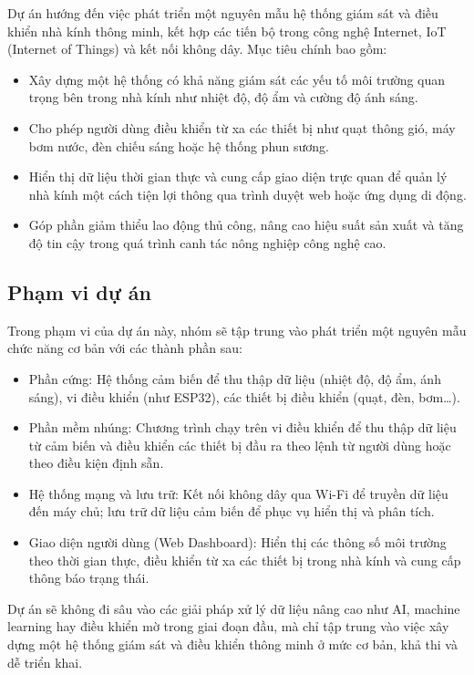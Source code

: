 Dự án hướng đến việc phát triển một nguyên mẫu hệ thống giám sát và điều khiển nhà kính thông minh, kết hợp các tiến bộ trong công nghệ Internet, IoT (Internet of Things) và kết nối không dây. Mục tiêu chính bao gồm:
\begin{itemize}
    \item Xây dựng một hệ thống có khả năng giám sát các yếu tố môi trường quan trọng bên trong nhà kính như nhiệt độ, độ ẩm và cường độ ánh sáng.
    \item Cho phép người dùng điều khiển từ xa các thiết bị như quạt thông gió, máy bơm nước, đèn chiếu sáng hoặc hệ thống phun sương.
    \item Hiển thị dữ liệu thời gian thực và cung cấp giao diện trực quan để quản lý nhà kính một cách tiện lợi thông qua trình duyệt web hoặc ứng dụng di động.
    \item Góp phần giảm thiểu lao động thủ công, nâng cao hiệu suất sản xuất và tăng độ tin cậy trong quá trình canh tác nông nghiệp công nghệ cao.
\end{itemize}

\subsection{Phạm vi dự án}

Trong phạm vi của dự án này, nhóm sẽ tập trung vào phát triển một nguyên mẫu chức năng cơ bản với các thành phần sau:

\begin{itemize}
    \item Phần cứng: Hệ thống cảm biến để thu thập dữ liệu (nhiệt độ, độ ẩm, ánh sáng), vi điều khiển (như ESP32), các thiết bị điều khiển (quạt, đèn, bơm…).
    \item Phần mềm nhúng: Chương trình chạy trên vi điều khiển để thu thập dữ liệu từ cảm biến và điều khiển các thiết bị đầu ra theo lệnh từ người dùng hoặc theo điều kiện định sẵn.
    \item Hệ thống mạng và lưu trữ: Kết nối không dây qua Wi-Fi để truyền dữ liệu đến máy chủ; lưu trữ dữ liệu cảm biến để phục vụ hiển thị và phân tích.
    \item Giao diện người dùng (Web Dashboard): Hiển thị các thông số môi trường theo thời gian thực, điều khiển từ xa các thiết bị trong nhà kính và cung cấp thông báo trạng thái.
\end{itemize}

Dự án sẽ không đi sâu vào các giải pháp xử lý dữ liệu nâng cao như AI, machine learning hay điều khiển mờ trong giai đoạn đầu, mà chỉ tập trung vào việc xây dựng một hệ thống giám sát và điều khiển thông minh ở mức cơ bản, khả thi và dễ triển khai.
\newpage









